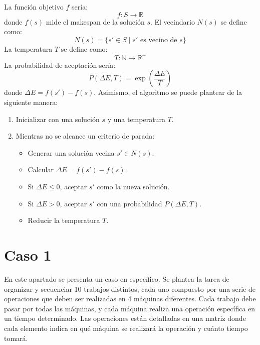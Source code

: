 \documentclass[11pt]{article}
\begin{document}
\vspace{1em} 
\noindent La función objetivo \( f \) sería:
    \[
    f: S \rightarrow \mathbb{R}
    \]
donde \( f(s) \) mide el makespan de la solución \( s \).
El vecindario \( N(s) \) se define como:
    \[
    N(s) = \{ s' \in S \mid s' \text{ es vecino de } s \}
    \]
La temperatura \( T \) se define como:   
    \[
    T: \mathbb{N} \rightarrow \mathbb{R}^+
    \]
La probabilidad de aceptación sería:
    \[
    P(\Delta E, T) = \exp\left(\frac{\Delta E}{T}\right)
    \]
    donde \( \Delta E = f(s') - f(s) \). Asimismo, el algoritmo se puede plantear de la siguiente manera:
    \begin{enumerate}
        \item Inicializar con una solución \( s \) y una temperatura \( T \).
        \item Mientras no se alcance un criterio de parada:
        \begin{itemize}
            \item Generar una solución vecina \( s' \in N(s) \).
            \item Calcular \( \Delta E = f(s') - f(s) \).
            \item Si \( \Delta E \leq 0 \), aceptar \( s' \) como la nueva solución.
            \item Si \( \Delta E > 0 \), aceptar \( s' \) con una probabilidad \( P(\Delta E, T) \).
            \item Reducir la temperatura \( T \).
        \end{itemize}
    \end{enumerate}

\section{Caso 1}
En este apartado se presenta un caso en específico. Se plantea la tarea de organizar y secuenciar 10 trabajos distintos, cada uno compuesto por una serie de operaciones que deben ser realizadas en 4 máquinas diferentes. Cada trabajo debe pasar por todas las máquinas, y cada máquina realiza una operación específica en un tiempo determinado. Las operaciones están detalladas en una matriz donde cada elemento indica en qué máquina se realizará la operación y cuánto tiempo tomará. 
\end{document}
